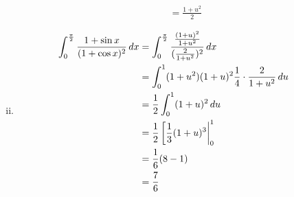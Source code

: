 \begin{enumerate}[(1)]
\begin{enumerate}[(i)]
\begin{itemize}
\begin{align}
                &=\frac{1+u^2}{2}
            \end{align}
        \end{itemize}
        \item 
        \begin{align}
            \int_0^\frac{\pi}{2}\frac{1+\sin x}{(1+\cos x)^2}\dd{x}
            &=\int_0^\frac{\pi}{2}\frac{\frac{(1+u)^2}{1+u^2}}{(\frac{2}{1+u^2})^2}\dd{x}\\
            &=\int_0^1(1+u^2)(1+u)^2\frac{1}{4}\cdot\frac{2}{1+u^2}\dd{u}\\
            &=\frac{1}{2}\int_0^1(1+u)^2\dd{u}\\
            &=\frac{1}{2}\eval[\frac{1}{3}(1+u)^3|_{0}^{1}\\
            &=\frac{1}{6}(8-1)\\
            &=\frac{7}{6}
        \end{align}
    \end{enumerate}
\end{enumerate}

